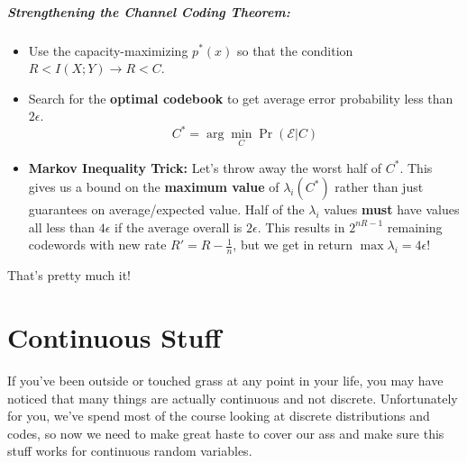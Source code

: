 \documentclass[a4paper,12pt]{report}
\begin{document}
\paragraph{Strengthening the Channel Coding Theorem: } 
\begin{itemize}
\item Use the capacity-maximizing $p^*(x)$ so that the condition $R < I(X; Y)
\to R< C$.

\item Search for the \textbf{optimal codebook} to get average error probability
less than $2\epsilon$.
	\begin{equation}
		C^* = \arg\min_C \Pr(\mathcal E | C)
	\end{equation}

\item \textbf{Markov Inequality Trick:} Let's throw away the worst half of
$C^*$. This gives us a bound on the \textbf{maximum value} of $\lambda_i(C^*)$
rather than just guarantees on average/expected value. Half of the $\lambda_i$
values \textbf{must} have values all less than $4\epsilon$ if the average
overall is $2\epsilon$. This results in $2^{nR-1}$ remaining codewords with new
rate $R' = R - \frac 1 n$, but we get in return $\max \lambda_i = 4\epsilon$!
\end{itemize}

That's pretty much it! 





















\chapter{Continuous Stuff}

If you've been outside or touched grass at any point in your life, you may have
noticed that many things are actually continuous and not discrete. Unfortunately
for you, we've spend most of the course looking at discrete distributions and
codes, so now we need to make great haste to cover our ass and make sure this
stuff works for continuous random variables. 
\end{document}
